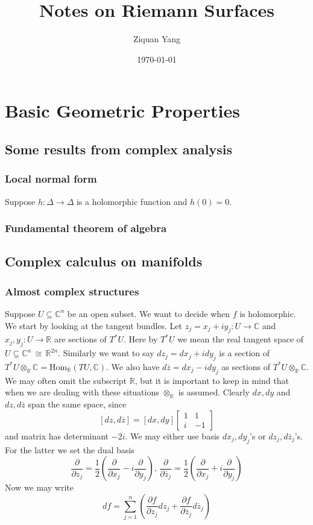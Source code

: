 \documentclass[12pt]{article}
\theoremstyle{plain}
\theoremstyle{definition}
\newcommand{\IC}{\mathbb{C}}
\newcommand{\IR}{\mathbb{R}}
\newcommand{\Hom}{\mathrm{Hom}}
\newcommand\iso{{\, \cong \,}}
\newcommand\tensor{{\otimes}}
\newcommand{\<}{\langle}
\renewcommand{\>}{\rangle}
\newcommand{\p}{\partial}
\newcommand{\half}{\frac{1}{2}}
\newcommand{\bz}{\overline{z}}
\newcommand{\ddzj}{\frac{\p}{\p z_j}}
\newcommand{\ddbzj}{\frac{\p}{\p \bz_j}}
\newcommand{\ddxj}{\frac{\p}{\p x_j}}
\newcommand{\ddyj}{\frac{\p}{\p y_j}}
\begin{document}
%

\title{Notes on Riemann Surfaces}
\author{Ziquan Yang}


\date{\today}

\maketitle
 
\tableofcontents

\setcounter{section}{0}
\section{Basic Geometric Properties}

\subsection{Some results from complex analysis}
\subsubsection{Local normal form}
Suppose $h : \Delta \to \Delta$ is a holomorphic function and $h(0) = 0$. 

\subsubsection{Fundamental theorem of algebra}
\subsection{Complex calculus on manifolds}

\subsubsection{Almost complex structures}
Suppose $U \subseteq \IC^n$ be an open subset. We want to decide when $f$ is holomorphic. We start by looking at the tangent bundles. Let $z_j = x_j + iy_j : U \to \IC$ and $x_j, y_j : U \to \IR$ are sections of $T^* U$. Here by $T^* U$ we mean the real tangent space of $U \subseteq \IC^n \iso \IR^{2n}$. Similarly we want to say $dz_j = dx_j + i dy_j$ is a section of $T^* U \tensor_\IR \IC = \Hom_\IR(TU, \IC)$. We also have $d\bz = dx_j - i dy_j$ as sections of $T^* U \tensor_\IR \IC$. We may often omit the subscript $\IR$, but it is important to keep in mind that when we are dealing with these situations $\tensor_\IR$ is assumed. Clearly $dx, dy$ and $dz, d\bz$ span the same space, since
$$ [dz, d\bz] = [dx, dy] \begin{bmatrix}
1 & 1 \\ i & -1 
\end{bmatrix}  $$
and matrix has determinant $-2i$. We may either use basis $dx_j, dy_j$'s or $dz_j, d\bz_j$'s. For the latter we set the dual basis
$$ \ddzj = \half( \ddxj - i \ddyj ), \, \ddbzj = \half (\ddxj + i \ddyj) $$
Now we may write 
$$ df = \sum_{j = 1}^n (\frac{\p f}{\p z_j} dz_j + \frac{\p f}{\p \bz_j} d
\bz_j) $$
\end{document}
